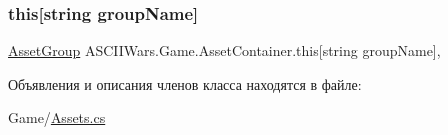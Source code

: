 \subsubsection{\texorpdfstring{this[string group\+Name]}{this[string groupName]}}
{\footnotesize\ttfamily \hyperlink{class_a_s_c_i_i_wars_1_1_game_1_1_asset_group}{Asset\+Group} A\+S\+C\+I\+I\+Wars.\+Game.\+Asset\+Container.\+this\mbox{[}string group\+Name\mbox{]}\hspace{0.3cm}{\ttfamily [get]}, {\ttfamily [set]}}



Объявления и описания членов класса находятся в файле\+:\begin{DoxyCompactItemize}
\item 
Game/\hyperlink{_assets_8cs}{Assets.\+cs}\end{DoxyCompactItemize}
